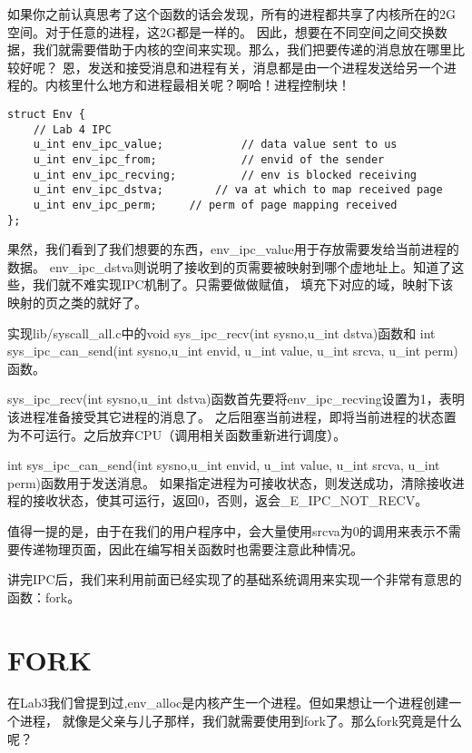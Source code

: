 如果你之前认真思考了这个函数的话会发现，所有的进程都共享了内核所在的2G空间。对于任意的进程，这2G都是一样的。
因此，想要在不同空间之间交换数据，我们就需要借助于内核的空间来实现。那么，我们把要传递的消息放在哪里比较好呢？
恩，发送和接受消息和进程有关，消息都是由一个进程发送给另一个进程的。内核里什么地方和进程最相关呢？啊哈！进程控制块！

\begin{verbatim}
struct Env {
    // Lab 4 IPC
    u_int env_ipc_value;            // data value sent to us
    u_int env_ipc_from;             // envid of the sender
    u_int env_ipc_recving;          // env is blocked receiving
    u_int env_ipc_dstva;        // va at which to map received page
    u_int env_ipc_perm;     // perm of page mapping received
};
\end{verbatim}

果然，我们看到了我们想要的东西，env\_ipc\_value用于存放需要发给当前进程的数据。
env\_ipc\_dstva则说明了接收到的页需要被映射到哪个虚地址上。知道了这些，我们就不难实现IPC机制了。只需要做做赋值，
填充下对应的域，映射下该映射的页之类的就好了。

\begin{exercise}
实现lib/syscall\_all.c中的void sys\_ipc\_recv(int sysno,u\_int dstva)函数和
int sys\_ipc\_can\_send(int sysno,u\_int envid, u\_int value, u\_int srcva, u\_int perm)函数。
\end{exercise}

sys\_ipc\_recv(int sysno,u\_int dstva)函数首先要将env\_ipc\_recving设置为1，表明该进程准备接受其它进程的消息了。
之后阻塞当前进程，即将当前进程的状态置为不可运行。之后放弃CPU（调用相关函数重新进行调度）。

int sys\_ipc\_can\_send(int sysno,u\_int envid, u\_int value, u\_int srcva, u\_int perm)函数用于发送消息。
如果指定进程为可接收状态，则发送成功，清除接收进程的接收状态，使其可运行，返回0，否则，返会\_E\_IPC\_NOT\_RECV。

值得一提的是，由于在我们的用户程序中，会大量使用srcva为0的调用来表示不需要传递物理页面，因此在编写相关函数时也需要注意此种情况。

讲完IPC后，我们来利用前面已经实现了的基础系统调用来实现一个非常有意思的函数：fork。

\section{FORK}

在Lab3我们曾提到过,env\_alloc是内核产生一个进程。但如果想让一个进程创建一个进程，
就像是父亲与儿子那样，我们就需要使用到fork了。那么fork究竟是什么呢？

